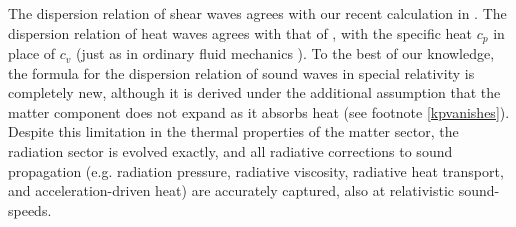 \documentclass[a4paper, amsfonts, amssymb, amsmath, reprint, showkeys, nofootinbib, twoside,notitlepage,onecolumn]{revtex4-2}
\theoremstyle{definition}
\theoremstyle{theorem}
\theoremstyle{corollary}
\begin{document}
The dispersion relation of shear waves agrees with our recent calculation in \cite{GavassinoShearRadiation2024jej}. The dispersion relation of heat waves agrees with that of \citet{Spiegel1957}, with the specific heat $c_p$ in place of $c_v$ (just as in ordinary fluid mechanics \cite{landau6}). To the best of our knowledge, the formula for the dispersion relation of sound waves in special relativity is completely new, although it is derived under the additional assumption that the matter component does not expand as it absorbs heat (see footnote \ref{kpvanishes}). Despite this limitation in the thermal properties of the matter sector, the radiation sector is evolved exactly, and all radiative corrections to sound propagation (e.g. radiation pressure, radiative viscosity, radiative heat transport, and acceleration-driven heat) are accurately captured, also at relativistic sound-speeds.
\end{document}
